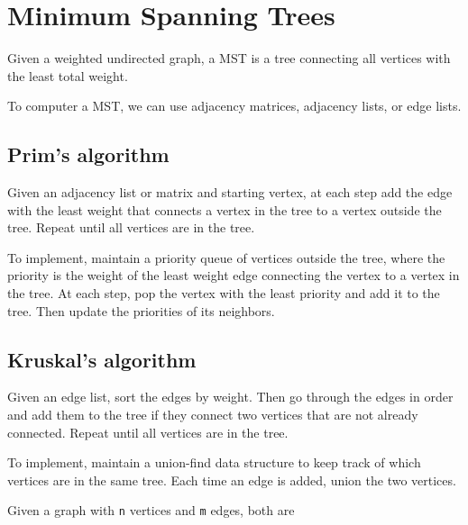 \section{Minimum Spanning Trees}
Given a weighted undirected graph, a MST is a tree connecting all vertices with the least total weight.

To computer a MST, we can use adjacency matrices, adjacency lists, or edge lists.

\subsection{Prim's algorithm}
Given an adjacency list or matrix and starting vertex, at each step add the edge with the least weight that connects a vertex in the tree to a vertex outside the tree.
Repeat until all vertices are in the tree.

To implement, maintain a priority queue of vertices outside the tree, where the priority is the weight of the least weight edge connecting the vertex to a vertex in the tree. 
At each step, pop the vertex with the least priority and add it to the tree. 
Then update the priorities of its neighbors.

\subsection{Kruskal's algorithm}
Given an edge list, sort the edges by weight. 
Then go through the edges in order and add them to the tree if they connect two vertices that are not already connected. Repeat until all vertices are in the tree.

To implement, maintain a union-find data structure to keep track of which vertices are in the same tree.
Each time an edge is added, union the two vertices.


Given a graph with \verb|n| vertices and \verb|m| edges, both are
